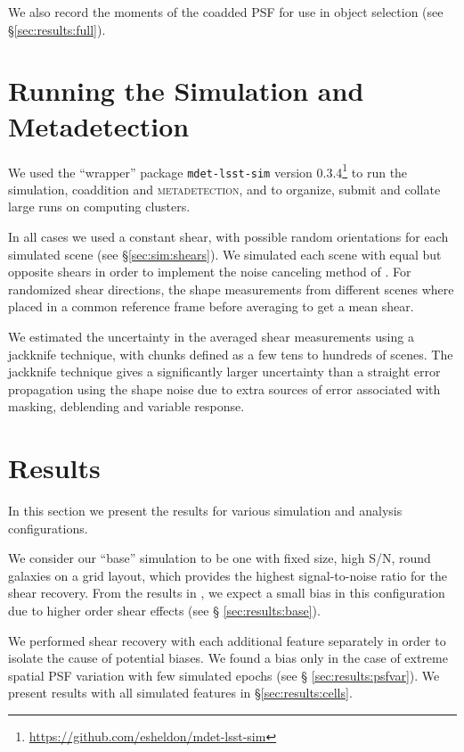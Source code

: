 \documentclass[twocolumn,twocolappendix,astrosym]{openjournal}
\newcommand{\mdet}{\textsc{metadetection}}
\begin{document}
We also record the moments of the coadded PSF for use in object selection (see
\S \ref{sec:results:full}).


\section{Running the Simulation and Metadetection} \label{sec:running}

We used the ``wrapper'' package \texttt{mdet-lsst-sim} version
0.3.4\footnote{\url{https://github.com/esheldon/mdet-lsst-sim}} to run the
simulation, coaddition and \mdet, and to organize, submit and collate large
runs on computing clusters.

In all cases we used a constant shear, with possible random orientations for
each simulated scene (see \S \ref{sec:sim:shears}).  We simulated each scene
with equal but opposite shears in order to implement the noise canceling method
of \cite{pujol2019}.  For randomized shear directions, the shape measurements
from different scenes where placed in a common reference frame before averaging
to get a mean shear.

We estimated the uncertainty in the averaged shear measurements using a
jackknife technique, with chunks defined as a few tens to hundreds of scenes.
The jackknife technique gives a significantly larger uncertainty than a
straight error propagation using the shape noise due to extra sources of error
associated with masking, deblending and variable response.

\section{Results} \label{sec:results}

In this section we present the results for various simulation and analysis
configurations.

We consider our ``base'' simulation to be one with fixed size, high S/N, round
galaxies on a grid layout, which provides the highest signal-to-noise ratio for
the shear recovery. From the results in \citet{mdet20}, we expect a small bias
in this configuration due to higher order shear effects (see \S
\ref{sec:results:base}).

We performed shear recovery with each additional feature separately in order to
isolate the cause of potential biases.  We found a bias only in the case of
extreme spatial PSF variation with few simulated epochs (see \S
\ref{sec:results:psfvar}).  We present results with all simulated features in
\S \ref{sec:results:cells}.
\end{document}
